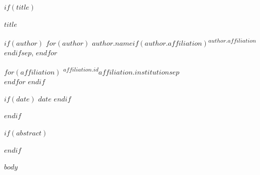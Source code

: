 \documentclass[$if(fontsize)$$fontsize$,$endif$$if(classoption)$$for(classoption)$$classoption$$sep$,$endfor$$endif$]{article}
\begin{document}
$if(title)$
\begin{center}
{\LARGE\bfseries $title$}
\vspace{1em}

$if(author)$
$for(author)$
$author.name$$if(author.affiliation)$\textsuperscript{$author.affiliation$}$endif$$sep$, $endfor$
\vspace{0.5em}

$for(affiliation)$
\textsuperscript{$affiliation.id$}$affiliation.institution$$sep$\\
$endfor$
$endif$

$if(date)$
\vspace{1em}
$date$
$endif$
\end{center}
$endif$

$if(abstract)$
\begin{abstract}
\noindent $abstract$

$if(keywords)$
\vspace{1em}
\noindent\textbf{Keywords:} $keywords$
$endif$

$if(jel)$
\vspace{0.5em}
\noindent\textbf{JEL Classification:} $jel$
$endif$
\end{abstract}
$endif$

\newpage

$body$
\end{document}
